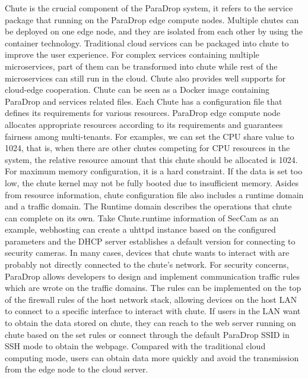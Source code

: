 {Chute is the crucial component of the ParaDrop system, it refers to the service package that running on the ParaDrop edge compute nodes. Multiple chutes can be deployed on one edge node, and they are isolated from each other by using the container technology. Traditional cloud services can be packaged into chute to improve the user experience. For complex services containing multiple microservices, part of them can be transformed into chute while rest of the microservices can still run in the cloud. Chute also provides well supports for cloud-edge cooperation.
Chute can be seen as a Docker image containing ParaDrop and services related files. Each Chute has a configuration file that defines its requirements for various resources. ParaDrop edge compute node allocates appropriate resources according to its requirements and guarantees fairness among multi-tenants. For examples, we can set the CPU share value to 1024, that is, when there are other chutes competing for CPU resources in the system, the relative resource amount that this chute should be allocated is 1024. For maximum memory configuration, it is a hard constraint. If the data is set too low, the chute kernel may not be fully booted due to insufficient memory.
Asides from resource information, chute configuration file also includes a runtime domain and a traffic domain. The Runtime domain describes the operations that chute can complete on its own. Take Chute.runtime information of SecCam as an example, webhosting can create a uhttpd instance based on the configured parameters and the DHCP server establishes a default version for connecting to security cameras. In many cases, devices that chute wants to interact with are probably not directly connected to the chute's network. For security concerns, ParaDrop allows developers to design and implement communication traffic rules which are wrote on the traffic domains. The rules can be implemented on the top of the firewall rules of the host network stack, allowing devices on the host LAN to connect to a specific interface to interact with chute. If users in the LAN want to obtain the data stored on chute, they can reach to the web server running on chute based on the set rules or connect through the default ParaDrop SSID in SSH mode to obtain the webpage. Compared with the traditional cloud computing mode, users can obtain data more quickly and avoid the transmission from the edge node to the cloud server.

}
